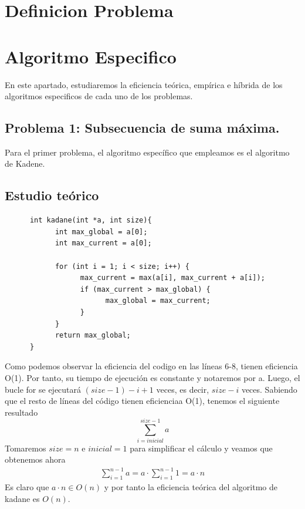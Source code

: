\documentclass[11pt,openany]{book}
\begin{document}
\chapter{Definicion Problema}
\chapter{Algoritmo Especifico}
En este apartado, estudiaremos la eficiencia teórica, empírica e híbrida de los algoritmos especificos
de cada uno de los problemas.
\section{Problema 1: Subsecuencia de suma máxima.}
Para el primer problema, el algoritmo específico que empleamos es el algoritmo de Kadene.
\section*{Estudio teórico}
\begin{lstlisting}
      int kadane(int *a, int size){
            int max_global = a[0];
            int max_current = a[0];

            for (int i = 1; i < size; i++) {
                  max_current = max(a[i], max_current + a[i]);
                  if (max_current > max_global) {
                        max_global = max_current;
                  }
            }
            return max_global;
      }
\end{lstlisting}
Como podemos observar la eficiencia del codigo en las líneas 6-8, tienen eficiencia O(1). Por tanto,
su tiempo de ejecución es constante y notaremos por a. Luego, el bucle for se ejecutará  $(size-1)-i+1 $ 
veces, es decir, $size-i$ veces. Sabiendo que el resto de líneas del código tienen eficienciaa O(1), tenemos
el siguiente resultado
\begin{equation*}
      \sum_{i=inicial}^{size-1} a
  \end{equation*}
  Tomaremos $size =  n$ e $inicial = 1$ para simplificar el cálculo y veamos que obtenemos ahora
  \begin{equation*}\begin{split}
          \sum_{i=1}^{n-1} a = a \cdot \sum_{i=1}^{n-1} 1= a \cdot n
      \end{split}\end{equation*}
  Es claro que $a \cdot  n \in O(n)$ y por tanto la eficiencia teórica del algoritmo de kadane es $O(n)$.
\end{document}
